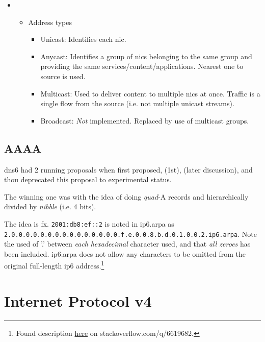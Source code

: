 \begin{itemize}
\begin{itemize}
\begin{itemize}
        \end{itemize}
    \end{itemize}
    \item {}
    \begin{itemize}
        \item Address types
        \begin{itemize}
            \item Unicast: Identifies each \gls{nic}.
            \item Anycast: Identifies a group of \glspl{nic} belonging to the same group and providing the same services/content/applications. Nearest one to source is used.
            \item Multicast: Used to deliver content to multiple \glspl{nic} at once. Traffic is a single flow from the source (i.e. not multiple unicast streams).
            \item Broadcast: \textit{Not} implemented. Replaced by use of multicast groups.
        \end{itemize}
    \end{itemize}
\end{itemize}

\subsection{AAAA}

\gls{dns6} had 2 running proposals when first proposed,  (1st),  (later discussion), and  thou deprecated this proposal to experimental status.

The winning one was  with the idea of doing \textit{quad}-A records and hierarchically divided by \textit{nibble} {\small (i.e. 4 bits)}.

The idea is fx. \texttt{2001:db8:ef::2} is noted in ip6.arpa as \texttt{2.0.0.0.0.0.0.0.0.0.0.0.0.0.0.0.f.e.0.0.8.b.d.0.1.0.0.2.ip6.arpa}. {\small Note the used of '.' between \textit{each} \textit{hexadecimal} character used, and that \textit{all zeroes} has been included. ip6.arpa does not allow any characters to be omitted from the original full-length \gls{ip6} address.}\footnote{Found description \href{https://stackoverflow.com/q/6619682}{here} on stackoverflow.com/q/6619682.}

\section[IPv4]{Internet Protocol v4}